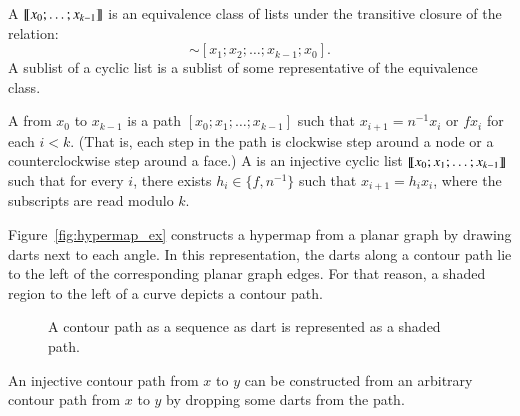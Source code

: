 \begin{definition}
A  ${\llbracket{x_0;\ldots;x_{k-1}}\rrbracket}$ is an equivalence class of lists under the transitive closure of the relation:
\begin{displaymath}
[x_0;x_1;x_2\ldots;x_{k-1}] \sim [x_1;x_2;\ldots;x_{k-1};x_0].
\end{displaymath}
A sublist of a cyclic list is a sublist of some representative of the equivalence class.
\end{definition}

\begin{definition} A  from
$x_0$ to $x_{k-1}$ is a path $[x_0;x_1;\ldots;x_{k-1}]$ such that
$x_{i+1} = n^{-1} x_i$ or $f x_i$ for each $i<k$.  (That is, each
step in the path is clockwise step around a node or a
counterclockwise step around a face.)  
A  is an injective cyclic list
${\llbracket{x_0;x_1;\ldots;x_{k-1}}\rrbracket}$ such that
for every $i$, there exists $h_i\in \{f,n^{-1}\}$ such that $x_{i+1} = h_i x_i$, 
where the subscripts are
read modulo $k$.
%
%
%
\end{definition}



\begin{remark} Figure~\ref{fig:hypermap_ex} constructs a hypermap from
a planar graph by drawing darts next to each angle.  In this
representation, the darts along a contour path lie to the left of
the corresponding planar graph edges.  For that reason, a shaded
region to the left of a curve depicts a contour path.
\end{remark}

\begin{figure}[htb]
\centering
{}
\caption{A contour path as a sequence as dart is represented as a
shaded path.}
\label{fig:shade-dart}
\end{figure}

\begin{lemma} An injective contour path from
$x$ to $y$ can be constructed from an arbitrary contour path from
$x$ to $y$ by dropping some darts from the path.
\end{lemma}

